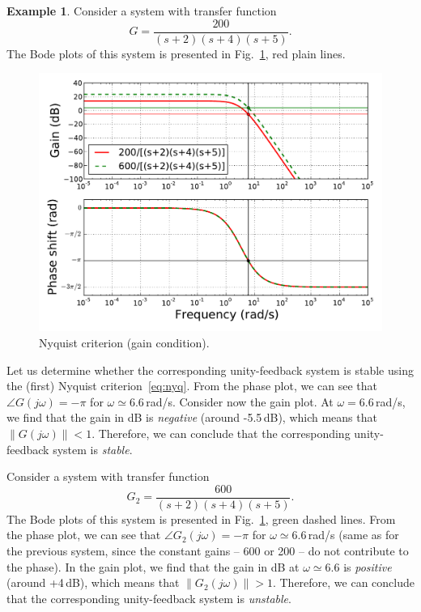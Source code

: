 \documentclass[a4paper,11pt]{report}
\theoremstyle{definition}
\newtheorem{mdexample}{Example}
\newenvironment{example}%
  {\vspace{0.1cm}\begin{mdframed}[backgroundcolor=lightgray]\begin{mdexample}}%
  {\end{mdexample}\end{mdframed}\vspace{0.1cm}}
\begin{document}
\begin{example}
  \label{ex:nyq}
  Consider a system with transfer function 
  \[
  G=\frac{200}{(s+2)(s+4)(s+5)}.
  \]
  The Bode plots of this system is presented in
  Fig.~\ref{fig:bode-nyq}, red plain lines.
  \begin{figure}[H]
    \centering
    \includegraphics[width=12cm]{fig/bode-nyq.pdf}
    \caption{Nyquist criterion (gain condition).}
    \label{fig:bode-nyq}
  \end{figure}

  Let us determine whether the corresponding unity-feedback system is
  stable using the (first) Nyquist criterion~\ref{eq:nyq}. From the
  phase plot, we can see that $\angle G(j\omega) = -\pi$ for
  $\omega\simeq 6.6$\,rad/s. Consider now the gain plot. At
  $\omega=6.6$\,rad/s, we find that the gain in dB is \emph{negative}
  (around -5.5\,dB), which means that $\|G(j\omega)\|<1$. Therefore,
  we can conclude that the corresponding unity-feedback system is
  \emph{stable}.

  Consider a system with transfer function 
  \[
  G_2=\frac{600}{(s+2)(s+4)(s+5)}.
  \]
  The Bode plots of this system is presented in
  Fig.~\ref{fig:bode-nyq}, green dashed lines. From the phase plot, we
  can see that $\angle G_2(j\omega) = -\pi$ for $\omega\simeq
  6.6$\,rad/s (same as for the previous system, since the constant
  gains -- 600 or 200 -- do not contribute to the phase). In the gain
  plot, we find that the gain in dB at $\omega\simeq 6.6$ is
  \emph{positive} (around +4\,dB), which means that
  $\|G_2(j\omega)\|>1$. Therefore, we can conclude that the
  corresponding unity-feedback system is \emph{unstable}.
\end{example}
\end{document}
